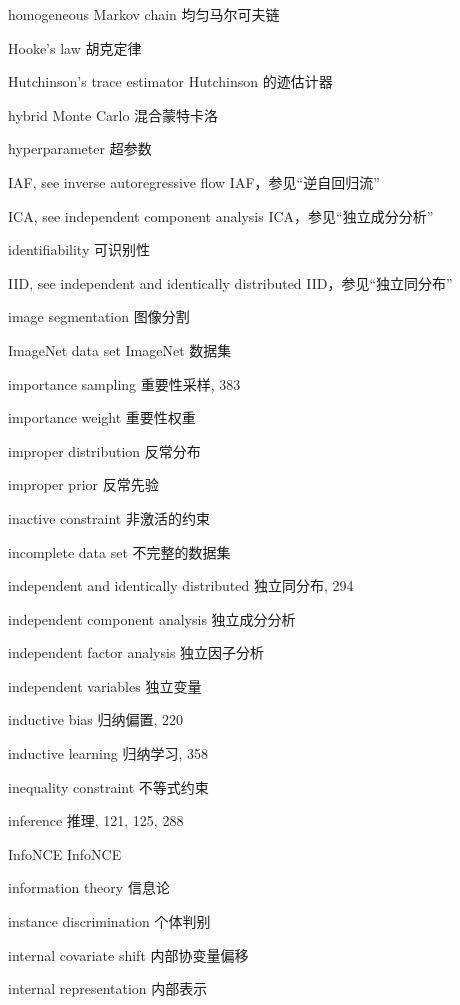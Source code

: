 homogeneous Markov chain 均匀马尔可夫链\par
Hooke’s law 胡克定律\par
Hutchinson’s trace estimator Hutchinson 的迹估计器\par
hybrid Monte Carlo 混合蒙特卡洛\par
hyperparameter 超参数\par
IAF, see inverse autoregressive flow IAF，参见“逆自回归流”\par
ICA, see independent component analysis ICA，参见“独立成分分析”\par
identifiability 可识别性\par
IID, see independent and identically distributed IID，参见“独立同分布”\par
image segmentation 图像分割\par
ImageNet data set ImageNet 数据集\par
importance sampling 重要性采样, 383\par
importance weight 重要性权重\par
improper distribution 反常分布\par
improper prior 反常先验\par
inactive constraint 非激活的约束\par
incomplete data set 不完整的数据集\par
independent and identically distributed 独立同分布, 294\par
independent component analysis 独立成分分析\par
independent factor analysis 独立因子分析\par
independent variables 独立变量\par
inductive bias 归纳偏置, 220\par
inductive learning 归纳学习, 358\par
inequality constraint 不等式约束\par
inference 推理, 121, 125, 288\par
InfoNCE InfoNCE\par
information theory 信息论\par
instance discrimination 个体判别\par
internal covariate shift 内部协变量偏移\par
internal representation 内部表示\par
